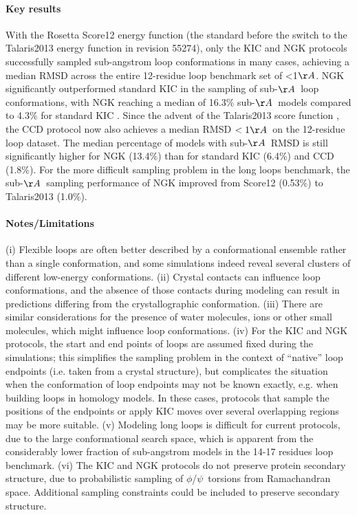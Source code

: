 \paragraph{Key results}
With the Rosetta Score12 energy function (the standard before the switch to the Talaris2013 energy function in revision 55274), only the KIC \cite{mandell_sub-angstrom_2009} and NGK \cite{stein_improvements_2013} protocols successfully sampled sub-angstrom loop conformations in many cases, achieving a median RMSD across the entire 12-residue loop benchmark set of <1$\AA$. NGK significantly outperformed standard KIC in the sampling of sub-$\AA$\ loop conformations, with NGK reaching a median of 16.3\% sub-$\AA$\ models compared to 4.3\% for standard KIC \cite{stein_improvements_2013}. Since the advent of the Talaris2013 score function \cite{omeara_combined_2015,clackson_hot_1995,bogan_anatomy_1998,darnell_kfc_2008,zhu_kfc2:_2011,kortemme_simple_2002,kortemme_computational_2004,ollikainen_computational_2013,ollikainen_chapter_2013,dokholyan_understanding_2001,kuhlman_native_2000,finn_pfam:_2014,dickson_identifying_2010,yona_within_2002,leaver-fay_chapter_2013}, the CCD protocol now also achieves a median RMSD $< 1\AA$\ on the 12-residue loop dataset. The median percentage of models with sub-$\AA$\ RMSD is still significantly higher for NGK (13.4\%) than for standard KIC (6.4\%) and CCD (1.8\%). For the more difficult sampling problem in the long loops benchmark, the sub-$\AA$\ sampling performance of NGK improved from Score12 (0.53\%) to Talaris2013 (1.0\%).
\paragraph{Notes/Limitations}
(i) Flexible loops are often better described by a conformational ensemble rather than a single conformation, and some simulations indeed reveal several clusters of different low-energy conformations. (ii) Crystal contacts can influence loop conformations, and the absence of those contacts during modeling can result in predictions differing from the crystallographic conformation. (iii) There are similar considerations for the presence of water molecules, ions or other small molecules, which might influence loop conformations. (iv) For the KIC and NGK protocols, the start and end points of loops are assumed fixed during the simulations; this simplifies the sampling problem in the context of ``native'' loop endpoints (i.e. taken from a crystal structure), but complicates the situation when the conformation of loop endpoints may not be known exactly, e.g. when building loops in homology models. In these cases, protocols that sample the positions of the endpoints or apply KIC moves over several overlapping regions may be more suitable. (v) Modeling long loops is difficult for current protocols, due to the large conformational search space, which is apparent from the considerably lower fraction of sub-angstrom models in the 14-17 residues loop benchmark. (vi) The KIC and NGK protocols do not preserve protein secondary structure, due to probabilistic sampling of $\phi$/$\psi$\ torsions from Ramachandran space. Additional sampling constraints could be included to preserve secondary structure.

